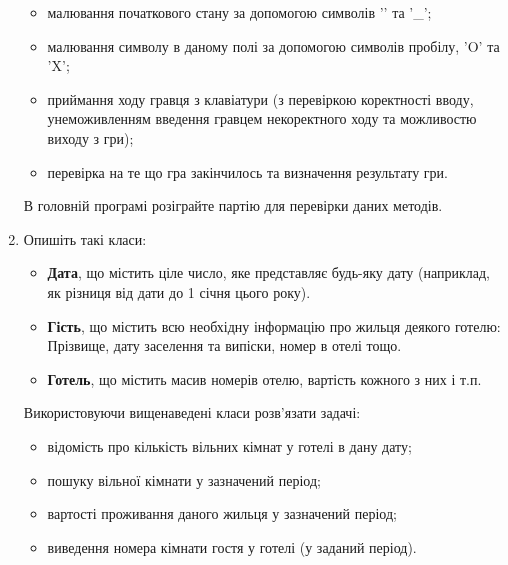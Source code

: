 \documentclass[]{article}
\begin{document}
\begin{enumerate}
  \begin{itemize}
  \item
    малювання початкового стану за допомогою символів '\textbar{}' та
    '\_';
  \item
    малювання символу в даному полі за допомогою символів пробілу, 'O'
    та 'X';
  \item
    приймання ходу гравця з клавіатури (з перевіркою коректності вводу,
    унеможивленням введення гравцем некоректного ходу та можливостю
    виходу з гри);
  \item
    перевірка на те що гра закінчилось та визначення результату гри.
  \end{itemize}

  В головній програмі розіграйте партію для перевірки даних методів.

\item
  Опишіть такі класи:

  \begin{itemize}
  \item
    \textbf{Дата}, що містить ціле число, яке представляє будь-яку дату
    (наприклад, як різниця від дати до 1 січня цього року).
  \item
    \textbf{Гість}, що містить всю необхідну інформацію про жильця
    деякого готелю: Прізвище, дату заселення та випіски, номер в отелі
    тощо.
  \item
    \textbf{Готель}, що містить масив номерів отелю, вартість кожного з
    них і т.п.
  \end{itemize}

  Використовуючи вищенаведені класи розв'язати задачі:

  \begin{itemize}
  \item
    відомість про кількість вільних кімнат у готелі в дану дату;
  \item
    пошуку вільної кімнати у зазначений період;
  \item
    вартості проживання даного жильця у зазначений період;
  \item
    виведення номера кімнати гостя у готелі (у заданий період).
  \end{itemize}


\end{enumerate}
\end{document}
